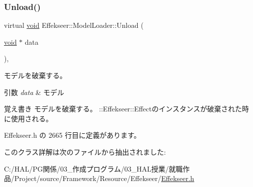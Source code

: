 \subsubsection{\texorpdfstring{Unload()}{Unload()}}
{\footnotesize\ttfamily virtual \mbox{\hyperlink{namespace_effekseer_ab34c4088e512200cf4c2716f168deb56}{void}} Effekseer\+::\+Model\+Loader\+::\+Unload (\begin{DoxyParamCaption}\item[{\mbox{\hyperlink{namespace_effekseer_ab34c4088e512200cf4c2716f168deb56}{void}} $\ast$}]{data }\end{DoxyParamCaption})\hspace{0.3cm}{\ttfamily [inline]}, {\ttfamily [virtual]}}



モデルを破棄する。 


\begin{DoxyParams}{引数}
{\em data} & モデル \\
\hline
\end{DoxyParams}
\begin{DoxyNote}{覚え書き}
モデルを破棄する。 \+::\+Effekseer\+::\+Effectのインスタンスが破棄された時に使用される。 
\end{DoxyNote}


 Effekseer.\+h の 2665 行目に定義があります。



このクラス詳解は次のファイルから抽出されました\+:\begin{DoxyCompactItemize}
\item 
C\+:/\+H\+A\+L/\+P\+G関係/03\+\_\+作成プログラム/03\+\_\+\+H\+A\+L授業/就職作品/\+Project/source/\+Framework/\+Resource/\+Effekseer/\mbox{\hyperlink{_effekseer_8h}{Effekseer.\+h}}\end{DoxyCompactItemize}
